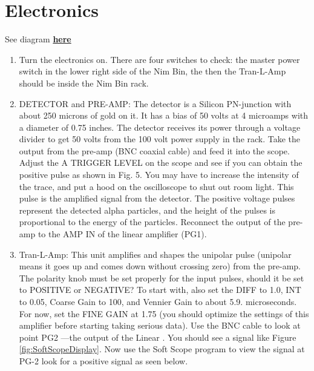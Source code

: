 \documentclass{../lab}
\begin{document}
\section{Electronics}

See diagram \href{http://physics111.lib.berkeley.edu/Physics111/Reprints/RUT/RUT_Positive-diagram.JPG}{\textbf{here}}

\begin{enumerate}
    \item Turn the electronics on. There are four switches to check: the master power switch in the lower right side of the Nim Bin, the then the Tran-L-Amp should be inside the Nim Bin rack.

    \item DETECTOR and PRE-AMP: The detector is a Silicon PN-junction with about 250 microns of gold on it. It has a bias of 50 volts at 4 microamps with a diameter of 0.75 inches. The detector receives its power through a voltage divider to get 50 volts from the 100 volt power supply in the rack. Take the output from the pre-amp (BNC coaxial cable) and feed it into the scope. Adjust the A TRIGGER LEVEL on the scope and see if you can obtain the positive pulse as shown in Fig. 5. You may have to increase the intensity of the trace, and put a hood on the oscilloscope to shut out room light. This pulse is the amplified signal from the detector. The positive voltage pulses represent the detected alpha particles, and the height of the pulses is proportional to the energy of the particles. Reconnect the output of the pre-amp to the AMP IN of the linear amplifier (PG1).

    \item Tran-L-Amp: This unit amplifies and shapes the unipolar pulse (unipolar means it goes up and comes down without crossing zero) from the pre-amp. The polarity knob must be set properly for the input pulses, should it be set to POSITIVE or NEGATIVE? To start with, also set the DIFF to 1.0, INT to 0.05, Coarse Gain to 100, and Vennier Gain to about 5.9. microseconds. For now, set the FINE GAIN at 1.75 (you should optimize the settings of this amplifier before starting taking serious data). Use the BNC cable to look at point PG2 ---the output of the Linear . You should see a signal like Figure \ref{fig:SoftScopeDisplay}. Now use the Soft Scope program to view the signal at PG-2 look for a positive signal as seen below.

\end{enumerate}
\end{document}
